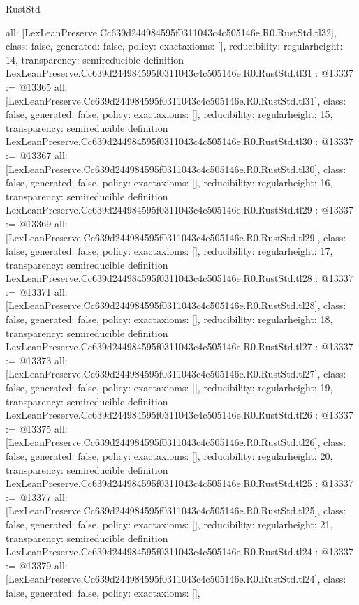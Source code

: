 \begin{lexlean}{RustStd}
\begin{coremodule}
{  all: [LexLeanPreserve.Cc639d244984595f0311043c4c505146e.R0.RustStd.tl32],
  class: false,
  generated: false,
  policy: exact{axioms: []},
  reducibility: regular{height: 14},
  transparency: semireducible
}
definition LexLeanPreserve.Cc639d244984595f0311043c4c505146e.R0.RustStd.tl31 : @13337 := @13365 {
  all: [LexLeanPreserve.Cc639d244984595f0311043c4c505146e.R0.RustStd.tl31],
  class: false,
  generated: false,
  policy: exact{axioms: []},
  reducibility: regular{height: 15},
  transparency: semireducible
}
definition LexLeanPreserve.Cc639d244984595f0311043c4c505146e.R0.RustStd.tl30 : @13337 := @13367 {
  all: [LexLeanPreserve.Cc639d244984595f0311043c4c505146e.R0.RustStd.tl30],
  class: false,
  generated: false,
  policy: exact{axioms: []},
  reducibility: regular{height: 16},
  transparency: semireducible
}
definition LexLeanPreserve.Cc639d244984595f0311043c4c505146e.R0.RustStd.tl29 : @13337 := @13369 {
  all: [LexLeanPreserve.Cc639d244984595f0311043c4c505146e.R0.RustStd.tl29],
  class: false,
  generated: false,
  policy: exact{axioms: []},
  reducibility: regular{height: 17},
  transparency: semireducible
}
definition LexLeanPreserve.Cc639d244984595f0311043c4c505146e.R0.RustStd.tl28 : @13337 := @13371 {
  all: [LexLeanPreserve.Cc639d244984595f0311043c4c505146e.R0.RustStd.tl28],
  class: false,
  generated: false,
  policy: exact{axioms: []},
  reducibility: regular{height: 18},
  transparency: semireducible
}
definition LexLeanPreserve.Cc639d244984595f0311043c4c505146e.R0.RustStd.tl27 : @13337 := @13373 {
  all: [LexLeanPreserve.Cc639d244984595f0311043c4c505146e.R0.RustStd.tl27],
  class: false,
  generated: false,
  policy: exact{axioms: []},
  reducibility: regular{height: 19},
  transparency: semireducible
}
definition LexLeanPreserve.Cc639d244984595f0311043c4c505146e.R0.RustStd.tl26 : @13337 := @13375 {
  all: [LexLeanPreserve.Cc639d244984595f0311043c4c505146e.R0.RustStd.tl26],
  class: false,
  generated: false,
  policy: exact{axioms: []},
  reducibility: regular{height: 20},
  transparency: semireducible
}
definition LexLeanPreserve.Cc639d244984595f0311043c4c505146e.R0.RustStd.tl25 : @13337 := @13377 {
  all: [LexLeanPreserve.Cc639d244984595f0311043c4c505146e.R0.RustStd.tl25],
  class: false,
  generated: false,
  policy: exact{axioms: []},
  reducibility: regular{height: 21},
  transparency: semireducible
}
definition LexLeanPreserve.Cc639d244984595f0311043c4c505146e.R0.RustStd.tl24 : @13337 := @13379 {
  all: [LexLeanPreserve.Cc639d244984595f0311043c4c505146e.R0.RustStd.tl24],
  class: false,
  generated: false,
  policy: exact{axioms: []},
}
\end{coremodule}
\end{lexlean}
